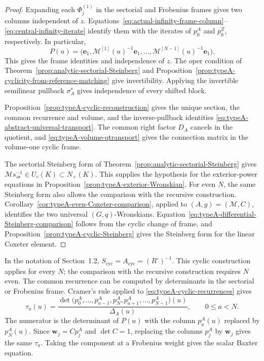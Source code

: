\documentclass[11pt,leqno]{amsart}
\numberwithin{equation}{section}
\theoremstyle{plain}
\theoremstyle{definition}
\theoremstyle{plain}
\theoremstyle{definition}
\theoremstyle{remark}
\begin{document}
\begin{proof}
Expanding each $\Phi_j^{(1)}$ in the sectorial and Frobenius frames gives two columns independent of $z$. Equations~\eqref{eq:actual-infinity-frame-column}--\eqref{eq:central-infinity-iterate} identify them with the iterates of $p_0^A$ and $p_0^Z$, respectively. In particular,
\[
 P(u)=\bigl(\mathbf e_1,\mathscr M^{[1]}(u)^{-1}\mathbf e_1,\ldots,
                  \mathscr M^{[N-1]}(u)^{-1}\mathbf e_1\bigr).
\]
This gives the frame identities and independence of $z$. The oper condition of Theorem~\ref{prop:analytic-sectorial-Steinberg} and Proposition~\ref{prop:typeA-cyclicity-from-reference-matching} give invertibility. Applying the invertible semilinear pullback $\sigma_A^s$ gives independence of every shifted block.

Proposition~\ref{prop:typeA-cyclic-reconstruction} gives the unique section, the common recurrence and volume, and the inverse-pullback identities \eqref{eq:typeA-abstract-universal-transport}. The common right factor $D_A$ cancels in the quotient, and \eqref{eq:typeA-volume-qtransport} gives the connection matrix in the volume-one cyclic frame.

The sectorial Steinberg form of Theorem~\ref{prop:analytic-sectorial-Steinberg} gives $\mathscr M s_{\mathrm{as}}^{-1}\in U_c(K)\subset N_+(K)$. This supplies the hypothesis for the exterior-power equations in Proposition~\ref{prop:typeA-exterior-Wronskian}. For even $N$, the same Steinberg form also allows the comparison with the recursive construction. Corollary~\ref{cor:typeA-even-Coxeter-comparison}, applied to $(A,g)=(\mathscr M,C)$, identifies the two universal $(G,q)$-Wronskians. Equation~\eqref{eq:typeA-differential-Steinberg-comparison} follows from the cyclic change of frame, and Proposition~\ref{prop:typeA-cyclic-Steinberg} gives the Steinberg form for the linear Coxeter element.
\end{proof}

In the notation of Section~1.2, $S_{\mathrm{cyc}}=A_{\mathrm{cyc}}=(R^\circ)^{-1}$. This cyclic construction applies for every $N$; the comparison with the recursive construction requires $N$ even. The common recurrence can be computed by determinants in the sectorial or Frobenius frame. Cramer's rule applied to \eqref{eq:typeA-cyclic-recurrences} gives
\begin{equation}\label{eq:typeA-tau-minor}
 \tau_a(u)
 =\frac{
  \det\bigl(p^A_0,\ldots,p^A_{a-1},
             p^A_N,p^A_{a+1},\ldots,p^A_{N-1}\bigr)(u)
 }{\Delta_A(u)},
 \qquad 0\le a<N.
\end{equation}
The numerator is the determinant of $P(u)$ with the column $p_a^A(u)$ replaced by $p_N^A(u)$.
Since $\mathbf w_j=Cp_j^A$ and $\det C=1$, replacing the columns $p_j^A$ by $\mathbf w_j$ gives the same $\tau_a$. Taking the component at a Frobenius weight gives the scalar Baxter equation.
\end{document}
